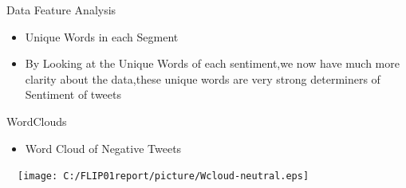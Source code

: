 \documentclass[
 size=14pt,
 paper=smartboard,  %
 mode=present, 		%
 display=slides, 	%
 style=tuliplab,  	%
 pauseslide,
 fleqn,leqno]{powerdot}
\begin{document}
\begin{slide}[toc=,bm=]{Data Feature Analysis}
\begin{itemize}
\item
Unique Words in each Segment
\item
By Looking at the Unique Words of each sentiment,we now have much more clarity about the data,these unique words are very strong determiners of Sentiment of tweets
\end{itemize}
\vspace{-0.8cm}
\begin{figure}[htbp]
\centering
{}%
%
%
\centering
\end{figure}
\end{slide}


\begin{slide}[toc=,bm=]{WordClouds}
\begin{itemize}
\item
Word Cloud of Negative Tweets
\end{itemize}
\vspace{-0.8cm}
\begin{center}
  \texttt{[image: C:/FLIP01report/picture/Wcloud-neutral.eps]}
\end{center}
\end{slide}

\end{document}
